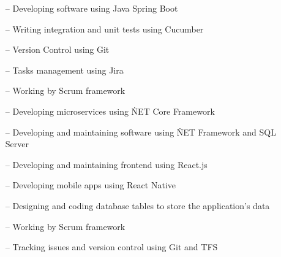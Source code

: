 \documentclass[10pt,a4paper]{altacv}
\begin{document}
\tagline{}

%

\begin{fullwidth}
\makecvheader
\end{fullwidth}

%





\begin{itemize}
    \setlength{\itemindent}{0.5em}
    \item[--]   \small{Developing software using Java Spring Boot}
    \item[--]   \small{Writing integration and unit tests using Cucumber}
    \item[--]   \small{Version Control using Git}
    \item[--]   \small{Tasks management using Jira}
    \item[--]   \small{Working by Scrum framework}
\end{itemize}

\medskip




\begin{itemize}
    \setlength{\itemindent}{0.5em}
    \item[--]   \small{Developing microservices using \.NET Core Framework}
    \item[--]   \small{Developing and maintaining software using \.NET Framework and SQL Server}
    \item[--]   \small{Developing and maintaining frontend using React.js}
    \item[--]   \small{Developing mobile apps using React Native}
    \item[--]   \small{Designing and coding database tables to store the application’s data}
    \item[--]   \small{Working by Scrum framework}
    \item[--]   \small{Tracking issues and version control using Git and TFS}
\end{itemize}
\end{document}

